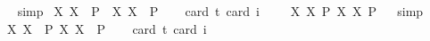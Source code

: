 \begin{isabellebody}
\isadelimproof
\ %
\endisadelimproof
%
\isatagproof
{}\isamarkupfalse%
\ simp%
\endisatagproof
{\isafoldproof}%
%
\isadelimproof
%
\endisadelimproof
\isanewline
{}\isamarkupfalse%
\ {\isachardoublequoteopen}{\isasymlfloor}{\isacharparenleft}{\isasymlambda}X{\isachardot}\ \isactrlbold {\isasymdiamond}\isactrlbold {\isasymexists}X{\isacharparenright}\ \ {\isacharparenleft}P{\isacharcolon}{\isacharcolon}{\isasymup}{\isasymlangle}{\isasymlangle}{\isasymzero}{\isasymrangle}{\isasymrangle}{\isacharparenright}\ \isactrlbold {\isasymrightarrow}\ {\isacharparenleft}{\isasymlambda}X{\isachardot}\ \isactrlbold {\isasymexists}X{\isacharparenright}\ \ P{\isasymrfloor}{\isachardoublequoteclose}\ \isanewline
\ \ \isamarkupfalse%
{\isacharbrackleft}card\ {\isacharprime}t{\isacharequal}{}{\isacharcomma}\ card\ i{\isacharequal}{}{\isacharbrackright}%
\isadelimproof
\ %
\endisadelimproof
%
\isatagproof
{}\isamarkupfalse%
\ %
%
\endisatagproof
{\isafoldproof}%
%
\isadelimproof
%
\endisadelimproof
\isanewline
{}\isamarkupfalse%
\ {\isachardoublequoteopen}{\isasymlfloor}{\isacharparenleft}{\isasymlambda}X{\isachardot}\ \isactrlbold {\isasymdiamond}\isactrlbold {\isasymexists}X{\isacharparenright}\ \isactrlbold {\isasymdown}{\isacharparenleft}P{\isacharcolon}{\isacharcolon}{\isasymup}{\isasymlangle}{\isasymup}{\isasymlangle}{\isasymzero}{\isasymrangle}{\isasymrangle}{\isacharparenright}\isactrlbold {\isasymrightarrow}\ {\isacharparenleft}{\isasymlambda}X{\isachardot}\ \isactrlbold {\isasymexists}X{\isacharparenright}\ \isactrlbold {\isasymdown}P{\isasymrfloor}{\isachardoublequoteclose}%
\isadelimproof
\ %
\endisadelimproof
%
\isatagproof
{}\isamarkupfalse%
\ simp%
\endisatagproof
{\isafoldproof}%
%
\isadelimproof
%
\endisadelimproof
\isanewline
{}\isamarkupfalse%
\ {\isachardoublequoteopen}{\isasymlfloor}{\isacharparenleft}{\isasymlambda}X{\isachardot}\ \isactrlbold {\isasymdiamond}\isactrlbold {\isasymexists}X{\isacharparenright}\ \ {\isacharparenleft}P{\isacharcolon}{\isacharcolon}{\isasymup}{\isasymlangle}{\isasymup}{\isasymlangle}{\isasymzero}{\isasymrangle}{\isasymrangle}{\isacharparenright}\isactrlbold {\isasymrightarrow}\ {\isacharparenleft}{\isasymlambda}X{\isachardot}\ \isactrlbold {\isasymexists}X{\isacharparenright}\ \ P{\isasymrfloor}{\isachardoublequoteclose}\ \isanewline
\ \ \isamarkupfalse%
{\isacharbrackleft}card\ {\isacharprime}t{\isacharequal}{}{\isacharcomma}\ card\ i{\isacharequal}{}{\isacharbrackright}%

\end{isabellebody}
